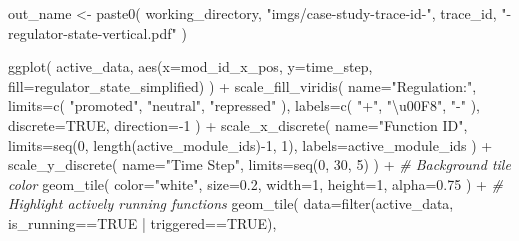 \documentclass[
]{book}
\newenvironment{Shaded}{\begin{snugshade}}{\end{snugshade}}
\newcommand{\AttributeTok}[1]{\textcolor[rgb]{0.77,0.63,0.00}{#1}}
\newcommand{\CommentTok}[1]{\textcolor[rgb]{0.56,0.35,0.01}{\textit{#1}}}
\newcommand{\ConstantTok}[1]{\textcolor[rgb]{0.00,0.00,0.00}{#1}}
\newcommand{\DecValTok}[1]{\textcolor[rgb]{0.00,0.00,0.81}{#1}}
\newcommand{\FloatTok}[1]{\textcolor[rgb]{0.00,0.00,0.81}{#1}}
\newcommand{\FunctionTok}[1]{\textcolor[rgb]{0.00,0.00,0.00}{#1}}
\newcommand{\NormalTok}[1]{#1}
\newcommand{\OtherTok}[1]{\textcolor[rgb]{0.56,0.35,0.01}{#1}}
\newcommand{\SpecialCharTok}[1]{\textcolor[rgb]{0.00,0.00,0.00}{#1}}
\newcommand{\StringTok}[1]{\textcolor[rgb]{0.31,0.60,0.02}{#1}}
\begin{document}
\begin{Shaded}
\begin{Highlighting}[]
\NormalTok{out\_name }\OtherTok{\textless{}{-}} \FunctionTok{paste0}\NormalTok{(}
\NormalTok{  working\_directory,}
  \StringTok{"imgs/case{-}study{-}trace{-}id{-}"}\NormalTok{,}
\NormalTok{   trace\_id,}
   \StringTok{"{-}regulator{-}state{-}vertical.pdf"}
\NormalTok{)}

\FunctionTok{ggplot}\NormalTok{(}
\NormalTok{    active\_data,}
    \FunctionTok{aes}\NormalTok{(}\AttributeTok{x=}\NormalTok{mod\_id\_x\_pos, }\AttributeTok{y=}\NormalTok{time\_step, }\AttributeTok{fill=}\NormalTok{regulator\_state\_simplified)}
\NormalTok{  ) }\SpecialCharTok{+}
  \FunctionTok{scale\_fill\_viridis}\NormalTok{(}
    \AttributeTok{name=}\StringTok{"Regulation:"}\NormalTok{,}
    \AttributeTok{limits=}\FunctionTok{c}\NormalTok{(}
      \StringTok{"promoted"}\NormalTok{,}
      \StringTok{"neutral"}\NormalTok{,}
      \StringTok{"repressed"}
\NormalTok{    ),}
    \AttributeTok{labels=}\FunctionTok{c}\NormalTok{(}
      \StringTok{"+"}\NormalTok{,}
      \StringTok{"\textbackslash{}u00F8"}\NormalTok{,}
      \StringTok{"{-}"}
\NormalTok{    ),}
    \AttributeTok{discrete=}\ConstantTok{TRUE}\NormalTok{,}
    \AttributeTok{direction=}\SpecialCharTok{{-}}\DecValTok{1}
\NormalTok{  ) }\SpecialCharTok{+}
  \FunctionTok{scale\_x\_discrete}\NormalTok{(}
    \AttributeTok{name=}\StringTok{"Function ID"}\NormalTok{,}
    \AttributeTok{limits=}\FunctionTok{seq}\NormalTok{(}\DecValTok{0}\NormalTok{, }\FunctionTok{length}\NormalTok{(active\_module\_ids)}\SpecialCharTok{{-}}\DecValTok{1}\NormalTok{, }\DecValTok{1}\NormalTok{),}
    \AttributeTok{labels=}\NormalTok{active\_module\_ids}
\NormalTok{  ) }\SpecialCharTok{+}
  \FunctionTok{scale\_y\_discrete}\NormalTok{(}
    \AttributeTok{name=}\StringTok{"Time Step"}\NormalTok{,}
    \AttributeTok{limits=}\FunctionTok{seq}\NormalTok{(}\DecValTok{0}\NormalTok{, }\DecValTok{30}\NormalTok{, }\DecValTok{5}\NormalTok{)}
\NormalTok{  ) }\SpecialCharTok{+}
  \CommentTok{\# Background tile color}
  \FunctionTok{geom\_tile}\NormalTok{(}
    \AttributeTok{color=}\StringTok{"white"}\NormalTok{,}
    \AttributeTok{size=}\FloatTok{0.2}\NormalTok{,}
    \AttributeTok{width=}\DecValTok{1}\NormalTok{,}
    \AttributeTok{height=}\DecValTok{1}\NormalTok{,}
    \AttributeTok{alpha=}\FloatTok{0.75}
\NormalTok{  ) }\SpecialCharTok{+}
  \CommentTok{\# Highlight actively running functions}
  \FunctionTok{geom\_tile}\NormalTok{(}
    \AttributeTok{data=}\FunctionTok{filter}\NormalTok{(active\_data, is\_running}\SpecialCharTok{==}\ConstantTok{TRUE} \SpecialCharTok{|}\NormalTok{ triggered}\SpecialCharTok{==}\ConstantTok{TRUE}\NormalTok{),}

\end{Highlighting}
\end{Shaded}
\end{document}
